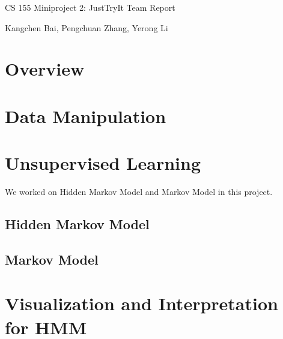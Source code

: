 





\pagestyle{fancy}

\LARGE
\begin{center}
CS 155 Miniproject 2: JustTryIt Team Report

\large
Kangchen Bai, Pengchuan Zhang, Yerong Li
\end{center}

\normalsize
\medskip

\section{Overview}



\section{Data Manipulation}


\section{Unsupervised Learning}
We worked on Hidden Markov Model and Markov Model in this project.

\subsection{Hidden Markov Model}

\subsection{Markov Model}

%

\section{Visualization and Interpretation for HMM}\label{sec:visualization}


